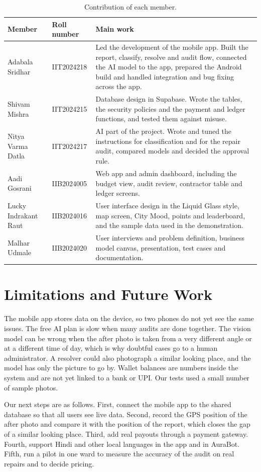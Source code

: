 \documentclass[conference,a4paper]{IEEEtran}
\begin{document}
\begin{table}[!t]\centering\footnotesize
\caption{Contribution of each member.}\label{tab:contrib}
\begin{tabular}{L{3.4cm}L{2.4cm}L{11cm}}\toprule
\textbf{Member} & \textbf{Roll number} & \textbf{Main work}\\\midrule
Adabala Sridhar & IIT2024218 & Led the development of the mobile app. Built the report, classify, resolve and audit flow, connected the AI model to the app, prepared the Android build and handled integration and bug fixing across the app.\\
Shivam Mishra & IIT2024215 & Database design in Supabase. Wrote the tables, the security policies and the payment and ledger functions, and tested them against misuse.\\
Nitya Varma Datla & IIT2024217 & AI part of the project. Wrote and tuned the instructions for classification and for the repair audit, compared models and decided the approval rule.\\
Aadi Gosrani & IIB2024005 & Web app and admin dashboard, including the budget view, audit review, contractor table and ledger screens.\\
Lucky Indrakant Raut & IIB2024016 & User interface design in the Liquid Glass style, map screen, City Mood, points and leaderboard, and the sample data used in the demonstration.\\
Malhar Udmale & IIB2024020 & User interviews and problem definition, business model canvas, presentation, test cases and documentation.\\\bottomrule
\end{tabular}\end{table}

\section{Limitations and Future Work}
The mobile app stores data on the device, so two phones do not yet see the same issues. The free AI plan is slow when many audits are done together. The vision model can be wrong when the after photo is taken from a very different angle or at a different time of day, which is why doubtful cases go to a human administrator. A resolver could also photograph a similar looking place, and the model has only the picture to go by. Wallet balances are numbers inside the system and are not yet linked to a bank or UPI. Our tests used a small number of sample photos.

Our next steps are as follows. First, connect the mobile app to the shared database so that all users see live data. Second, record the GPS position of the after photo and compare it with the position of the report, which closes the gap of a similar looking place. Third, add real payouts through a payment gateway. Fourth, support Hindi and other local languages in the app and in AuraBot. Fifth, run a pilot in one ward to measure the accuracy of the audit on real repairs and to decide pricing.
\end{document}
